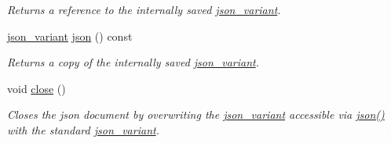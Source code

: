 \begin{DoxyCompactItemize}
\begin{DoxyCompactList}\small\item\em Returns a reference to the internally saved \hyperlink{classJSONLIB__NAMESPACE_1_1json__variant}{json\+\_\+variant}. \end{DoxyCompactList}\item 
\hyperlink{classJSONLIB__NAMESPACE_1_1json__variant}{json\+\_\+variant} \hyperlink{classJSONLIB__NAMESPACE_1_1json__document_afc25f82f6d2729be0ae1bcc82b8968e3}{json} () const
\begin{DoxyCompactList}\small\item\em Returns a copy of the internally saved \hyperlink{classJSONLIB__NAMESPACE_1_1json__variant}{json\+\_\+variant}. \end{DoxyCompactList}\item 
\mbox{\label{classJSONLIB__NAMESPACE_1_1json__document_a0a79ac1420c95c0f1de9670c7f81537d}} 
void \hyperlink{classJSONLIB__NAMESPACE_1_1json__document_a0a79ac1420c95c0f1de9670c7f81537d}{close} ()
\begin{DoxyCompactList}\small\item\em Closes the json document by overwriting the \hyperlink{classJSONLIB__NAMESPACE_1_1json__variant}{json\+\_\+variant} accessible via \hyperlink{classJSONLIB__NAMESPACE_1_1json__document_ad87b8e7d68ba854dbd730758273a3b93}{json()} with the standard \hyperlink{classJSONLIB__NAMESPACE_1_1json__variant}{json\+\_\+variant}. \end{DoxyCompactList}\end{DoxyCompactItemize}
